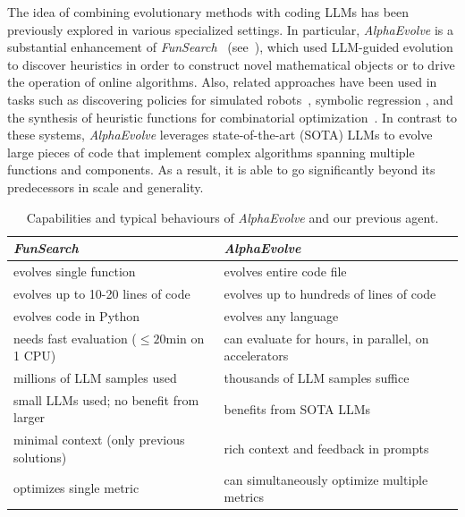 \documentclass[logo,copyright,12pt]{googledeepmind}
\theoremstyle{definition}
\theoremstyle{remark}
\theoremstyle{plain}
\newcommand{\method}{\emph{AlphaEvolve}\xspace}
\begin{document}
The idea of combining evolutionary methods with coding LLMs has been previously explored in various specialized settings.
In particular, \method is a substantial enhancement of \emph{FunSearch}~\cite{paredes2023mathematical} (see~), which used LLM-guided evolution to discover heuristics in order to construct novel mathematical objects or to drive the operation of online algorithms.
Also, related approaches have been used in tasks such as discovering policies for simulated robots~\cite{lehman2023evolution}, symbolic regression \citep{shojaee2025llmsr,grayeli2024symbolic}, and the synthesis of heuristic functions for combinatorial optimization~\cite{liu2024evolution}.
In contrast to these systems, \method leverages state-of-the-art (SOTA) LLMs to evolve large pieces of code that implement complex algorithms spanning multiple functions and components. As a result, it is able to go significantly beyond its predecessors in scale and generality.

\begin{table}[H]
\small
{}
\begin{center}
\begin{tabular}{ll} \toprule
    \emph{FunSearch}~\cite{paredes2023mathematical} & \method \\
    \midrule
    evolves single function & evolves entire code file\\
    evolves up to 10-20 lines of code & evolves up to hundreds of lines of code\\
    evolves code in Python & evolves any language\\
    needs fast evaluation ($\leq 20$min on 1 CPU)\;\; & can evaluate for hours, in parallel, on accelerators\\
    millions of LLM samples used & thousands of LLM samples suffice\\
    small LLMs used; no benefit from larger & benefits from SOTA LLMs\\ 
    minimal context (only previous solutions) & rich context and feedback in prompts\\
    optimizes single metric & can simultaneously optimize multiple metrics\\
    \bottomrule
\end{tabular}
\caption{Capabilities and typical behaviours of \method and our previous agent.}
\label{tab:funsearch-vs-alphaevolve}
\end{center}
\end{table}
\end{document}

